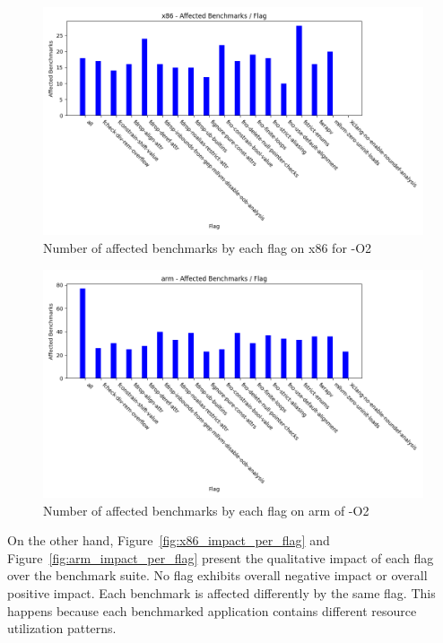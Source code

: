 \begin{figure}[H]
  \centering
  \includegraphics[scale=0.6]{x86_affected_bms_per_flag}
  \caption{Number of affected benchmarks by each flag on x86 for -O2}
  \label{fig:x86_affected_bms_per_flag}
\end{figure}

\begin{figure}[H]
  \centering
  \includegraphics[scale=0.6]{arm_affected_bms_per_flag}
  \caption{Number of affected benchmarks by each flag on arm of -O2}
  \label{fig:arm_affected_bms_per_flag}
\end{figure}

On the other hand, Figure~\ref{fig:x86_impact_per_flag} and
Figure~\ref{fig:arm_impact_per_flag} present the qualitative impact of each flag
over the benchmark suite. No flag exhibits overall negative impact or overall
positive impact. Each benchmark is affected differently by the same flag. This
happens because each benchmarked application contains different resource
utilization patterns.

